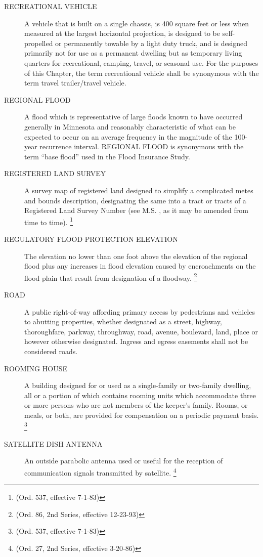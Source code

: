 \begin{description}
    \item[RECREATIONAL VEHICLE] A vehicle that is built on a single chassis, is 400 square feet or less when measured at the largest horizontal projection, is designed to be self-propelled or permanently towable by a light duty truck, and is designed primarily not for use as a permanent dwelling but as temporary living quarters for recreational, camping, travel, or seasonal use. For the purposes of this Chapter, the term recreational vehicle shall be synonymous with the term travel trailer/travel vehicle.
    \item[REGIONAL FLOOD] A flood which is representative of large floods known to have occurred generally in Minnesota and reasonably characteristic of what can be expected to occur on an average frequency in the magnitude of the 100-year recurrence interval. REGIONAL FLOOD is synonymous with the term “base flood” used in the Flood Insurance Study.
    \item[REGISTERED LAND SURVEY] A survey map of registered land designed to simplify a complicated metes and bounds description, designating the same into a tract or tracts of a Registered Land Survey Number (see M.S. , as it may be amended from time to time). \footnote{(Ord. 537, effective 7-1-83)}
    \item[REGULATORY FLOOD PROTECTION ELEVATION] The elevation no lower than one foot above the elevation of the regional flood plus any increases in flood elevation caused by encroachments on the flood plain that result from designation of a floodway. \footnote{(Ord. 86, 2nd Series, effective 12-23-93)}
    \item[ROAD] A public right-of-way affording primary access by pedestrians and vehicles to abutting properties, whether designated as a street, highway, thoroughfare, parkway, throughway, road, avenue, boulevard, land, place or however otherwise designated. Ingress and egress easements shall not be considered roads.
    \item[ROOMING HOUSE] A building designed for or used as a single-family or two-family dwelling, all or a portion of which contains rooming units which accommodate three or more persons who are not members of the keeper’s family.  Rooms, or meals, or both, are provided for compensation on a periodic payment basis. \footnote{(Ord. 537, effective 7-1-83)}
    \item[SATELLITE DISH ANTENNA] An outside parabolic antenna used or useful for the reception of communication signals transmitted by satellite. \footnote{(Ord. 27, 2nd Series, effective 3-20-86)}

\end{description}
